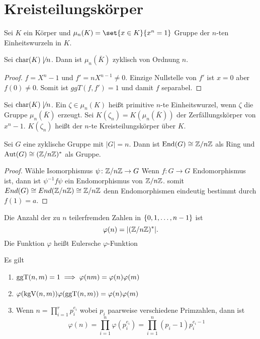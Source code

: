 \section{Kreisteilungskörper}
\begin{Def}
	Sei \(K\) ein Körper und \(\mu_n(K)=\set{x\in K}{ x^n=1}\) Gruppe der \(n\)-ten Einheitswurzeln in \(K\).
\end{Def}
\begin{Satz}
	Sei \(\operatorname{char} (K) \not\mid n\). Dann ist \(\mu_n(\bar K)\) zyklisch von Ordnung \(n\).
\end{Satz}
\begin{proof}
	\(f=X^n-1\) und \(f'=nX^{n-1}\neq 0\). Einzige Nullstelle von \(f'\) ist \(x=0\) aber \(f(0)\neq 0\). Somit ist \(ggT(f,f')=1\) und damit \(f\) separabel.
\end{proof}
\begin{Def}
	Sei \(\operatorname{char} (K)\not\mid n\). Ein \(\zeta\in\mu_n(K)\) heißt primitive \(n\)-te Einheitswurzel, wenn \(\zeta\) die Gruppe \(\mu_n(\bar K)\) erzeugt. Sei \(K(\zeta_n)=K(\mu_n(\bar K))\) der Zerfällungskörper von \(x^n-1\). \(K(\zeta_n)\) heißt der \(n\)-te Kreisteilungskörper über \(K\).
\end{Def}
\begin{Lemma}\label{Lem:MorGSn}
	Sei \(G\) eine zyklische Gruppe mit \(|G|=n\). Dann ist \(\operatorname{End}(G)\cong \mathbb{Z}/n\mathbb{Z}\) als Ring und \(\operatorname{Aut}(G)\cong (\mathbb{Z}/n\mathbb{Z})^*\) als Gruppe.
\end{Lemma}
\begin{proof}
	Wähle Isomorphismus \(\psi\colon \mathbb{Z}/n\mathbb{Z}\to G\) Wenn \(f\colon G\to G\) Endomorphismus ist, dann ist \(\psi^{-1}f\psi\) ein Endomorphismus von \(\mathbb{Z}/n\mathbb{Z}\).
	somit \(End(G)\cong End(\mathbb{Z}/n\mathbb{Z})\cong \mathbb{Z}/n\mathbb{Z}\) denn Endomorphismen eindeutig bestimmt durch \(f(1)=a\).
\end{proof}
\begin{Def}
	Die Anzahl der zu \(n\) teilerfremden Zahlen in \(\{0,1,\dots,n-1\}\) ist \[\varphi(n)=\lvert(\mathbb{Z}/n\mathbb{Z})^*\rvert.\] Die Funktion \(\varphi\) heißt Eulersche \(\varphi\)-Funktion
\end{Def}
\begin{Lemma} Es gilt
	\begin{enumerate}
		\item  \(\operatorname{ggT}(n,m)=1\implies \varphi(nm)=\varphi(n)\varphi(m)\)
		\item \(\varphi(\operatorname{kgV}(n,m))\varphi(\operatorname{ggT}(n,m))=\varphi(n)\varphi(m)\)
		\item Wenn \(n=\prod_{i=1}^rp_i^{e_i}\) wobei \(p_i\) paarweise verschiedene Primzahlen, dann ist 
		\[\varphi(n)=\prod_{i=1}^n\varphi(p_i^{e_i})=\prod_{i=1}^n(p_i-1)p_i^{e_i-1}\]
	\end{enumerate}
\end{Lemma}
